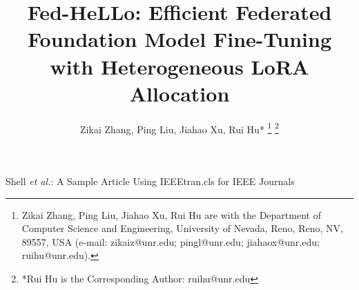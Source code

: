 \documentclass[lettersize,journal]{IEEEtran}
\begin{document}
\title{Fed-HeLLo: Efficient Federated Foundation Model Fine-Tuning with Heterogeneous LoRA Allocation}


\author{Zikai Zhang,
Ping Liu,
Jiahao Xu,
Rui Hu*
\thanks{Zikai Zhang, Ping Liu, Jiahao Xu, Rui Hu are with the Department of Computer Science and Engineering, University of Nevada, Reno, Reno, NV, 89557, USA (e-mail: zikaiz@unr.edu; pingl@unr.edu; jiahaox@unr.edu; ruihu@unr.edu).}
\thanks{*Rui Hu is the Corresponding Author: ruihu@unr.edu}
}

%
{Shell \MakeLowercase{\textit{et al.}}: A Sample Article Using IEEEtran.cls for IEEE Journals}


\maketitle
\end{document}
